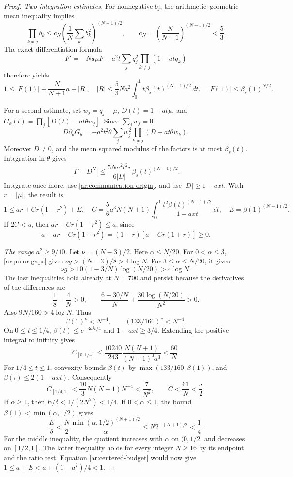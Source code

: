\documentclass[11pt,reqno]{amsart}
\numberwithin{equation}{section}
\theoremstyle{definition}
\theoremstyle{remark}
\begin{document}
\begin{proof}
\smallskip
\noindent\emph{Two integration estimates.}
For nonnegative $b_j$, the arithmetic--geometric mean inequality implies
\[
 \prod_{k\ne j}b_k
 \le c_N\left(\frac1N\sum_kb_k^2\right)^{(N-1)/2},
 \qquad c_N=\left(\frac N{N-1}\right)^{(N-1)/2}<\frac53.
\]
The exact differentiation formula
\[
 F'=-Na\mu F-a^2t\sum_jq_j^2\prod_{k\ne j}(1-atq_k)
\]
therefore yields
\begin{equation}\label{ar:direct-budget}
 1\le |F(1)|+\frac N{N+1}a+|R|,
 \quad
 |R|\le\frac53Na^2\int_0^1t\beta_s(t)^{(N-1)/2}\,dt,
 \quad |F(1)|\le\beta_s(1)^{N/2}.
\end{equation}

For a second estimate, set $w_j=q_j-\mu$, $D(t)=1-at\mu$, and
$G_\theta(t)=\prod_j[D(t)-at\theta w_j]$.  Since $\sum_jw_j=0$,
\[
 D\partial_\theta G_\theta
 =-a^2t^2\theta\sum_jw_j^2\prod_{k\ne j}(D-at\theta w_k).
\]
Moreover $D\ne0$, and the mean squared modulus of the factors is at
most $\beta_s(t)$. Integration in $\theta$ gives
\[
 |F-D^N|\le\frac{5Na^2t^2v}{6|D|}\beta_s(t)^{(N-1)/2}.
\]
Integrate once more, use \eqref{ar:communication-origin}, and use
$|D|\ge1-axt$. With $r=|\mu|$, the result is
\begin{equation}\label{ar:centered-budget}
 1\le ar+C r(1-r^2)+E,
 \quad
 C=\frac56a^3N(N+1)\int_0^1
       \frac{t^2\beta(t)^{(N-1)/2}}{1-axt}\,dt,
 \quad E=\beta(1)^{(N+1)/2}.
\end{equation}
If $2C<a$, then $ar+Cr(1-r^2)\le a$, since
\[
 a-ar-Cr(1-r^2)=(1-r)[a-Cr(1+r)]\ge0.
\]

\smallskip
\noindent\emph{The range $a^2\ge9/10$.}
Let $\nu=(N-3)/2$. Here $\alpha\le N/20$.
For $0<\alpha\le3$, \eqref{ar:polar-gaps} gives
$\nu g>(N-3)/8>4\log N$.
For $3\le\alpha\le N/20$, it gives
\[
 \nu g>10(1-3/N)\log(N/20)>4\log N.
\]
The last inequalities hold already at $N=700$ and persist because the
derivatives of the differences are
\[
 \frac18-\frac4N>0,\qquad
 \frac{6-30/N}{N}+\frac{30\log(N/20)}{N^2}>0.
\]
Also $9N/160>4\log N$. Thus
\[
 \beta(1)^\nu<N^{-4},\qquad (133/160)^\nu<N^{-4}.
\]
On $0\le t\le1/4$,
$\beta(t)\le e^{-3a^2t/4}$ and $1-axt\ge3/4$.
Extending the positive integral to infinity gives
\[
 C_{[0,1/4]}
 \le\frac{10240}{243}\frac{N(N+1)}{(N-1)^3a^3}<\frac{60}{N}.
\]
For $1/4\le t\le1$, convexity bounds $\beta(t)$ by
$\max(133/160,\beta(1))$, and $\beta(t)\le2(1-axt)$.
Consequently
\[
 C_{[1/4,1]}<\frac{10}{3}N(N+1)N^{-4}<\frac7{N^2},
 \qquad C<\frac{61}{N}<\frac a2.
\]
If $\alpha\ge1$, then $E/\delta<1/(2N^3)<1/4$.
If $0<\alpha\le1$, the bound
$\beta(1)<\min(\alpha,1/2)$ gives
\[
 \frac E\delta<\frac N2
 \frac{\min(\alpha,1/2)^{(N+1)/2}}\alpha
 \le N2^{-(N+1)/2}<\frac14.
\]
For the middle inequality, the quotient increases with $\alpha$
on $(0,1/2]$ and decreases on $[1/2,1]$.
The latter inequality holds for every integer $N\ge16$ by its endpoint
and the ratio test. Equation \eqref{ar:centered-budget} would now give
$1\le a+E<a+(1-a^2)/4<1$.


\end{proof}
\end{document}
